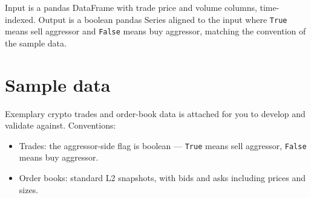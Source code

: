 \documentclass[11pt]{article}
\begin{document}
Input is a pandas DataFrame with trade price and volume columns, time-indexed. Output is a boolean pandas Series aligned to the input where \texttt{True} means sell aggressor and \texttt{False} means buy aggressor, matching the convention of the sample data.

\section*{Sample data}

Exemplary crypto trades and order-book data is attached for you to develop and validate against. Conventions:

\begin{itemize}
    \item Trades: the aggressor-side flag is boolean --- \texttt{True} means sell aggressor, \texttt{False} means buy aggressor.
    \item Order books: standard L2 snapshots, with bids and asks including prices and sizes.
\end{itemize}
\end{document}
